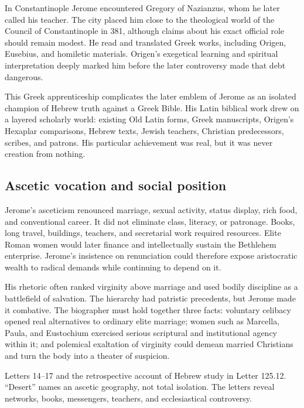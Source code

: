 In Constantinople Jerome encountered Gregory of Nazianzus, whom he later
called his teacher. The city placed him close to the theological world of the
Council of Constantinople in 381, although claims about his exact official role
should remain modest. He read and translated Greek works, including Origen,
Eusebius, and homiletic materials. Origen's exegetical learning and spiritual
interpretation deeply marked him before the later controversy made that debt
dangerous.

This Greek apprenticeship complicates the later emblem of Jerome as an
isolated champion of Hebrew truth against a Greek Bible. His Latin biblical
work drew on a layered scholarly world: existing Old Latin forms, Greek
manuscripts, Origen's Hexaplar comparisons, Hebrew texts, Jewish teachers,
Christian predecessors, scribes, and patrons. His particular achievement was
real, but it was never creation from nothing.

\subsection{Ascetic vocation and social position}

Jerome's asceticism renounced marriage, sexual activity, status display, rich
food, and conventional career. It did not eliminate class, literacy, or
patronage. Books, long travel, buildings, teachers, and secretarial work
required resources. Elite Roman women would later finance and intellectually
sustain the Bethlehem enterprise. Jerome's insistence on renunciation could
therefore expose aristocratic wealth to radical demands while continuing to
depend on it.

His rhetoric often ranked virginity above marriage and used bodily discipline
as a battlefield of salvation. The hierarchy had patristic precedents, but
Jerome made it combative. The biographer must hold together three facts:
voluntary celibacy opened real alternatives to ordinary elite marriage;
women such as Marcella, Paula, and Eustochium exercised serious scriptural and
institutional agency within it; and polemical exaltation of virginity could
demean married Christians and turn the body into a theater of suspicion.

{Letters 14--17 and the retrospective account of Hebrew study in Letter
125.12.}
{“Desert” names an ascetic geography, not total isolation. The letters reveal
networks, books, messengers, teachers, and ecclesiastical controversy.}
